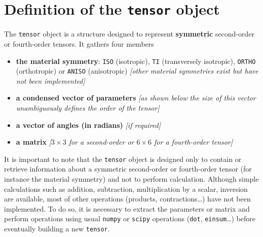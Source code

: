 \documentclass[
  a4paper,
  numbers=noendperiod,
  DIV=12]{scrreprt}
\providecommand{\tightlist}{%
  \setlength{\itemsep}{0pt}\setlength{\parskip}{0pt}}\usepackage{longtable,booktabs,array}
\begin{document}
\section{\texorpdfstring{Definition of the \texttt{tensor}
object}{Definition of the tensor object}}\label{definition-of-the-tensor-object}

The \texttt{tensor} object is a structure designed to represent
\textbf{symmetric} second-order or fourth-order tensors. It gathers four
members

\begin{itemize}
\tightlist
\item
  \textbf{the material symmetry}: \texttt{ISO} (isotropic), \texttt{TI}
  (transversely isotropic), \texttt{ORTHO} (orthotropic) or
  \texttt{ANISO} (anisotropic) \emph{{[}other material symmetries exist
  but have not been implemented{]}}
\item
  \textbf{a condensed vector of parameters} \emph{{[}as shown below the
  size of this vector unambiguously defines the order of the tensor{]}}
\item
  \textbf{a vector of angles (in radians)} \emph{{[}if required{]}}
\item
  \textbf{a matrix} \emph{{[}\(3×3\) for a second-order or \(6×6\) for a
  fourth-order tensor{]}}
\end{itemize}

\begin{tcolorbox}[enhanced jigsaw, title=\textcolor{quarto-callout-warning-color}{\faExclamationTriangle}\hspace{0.5em}{Warning}, left=2mm, titlerule=0mm, colback=white, breakable, colframe=quarto-callout-warning-color-frame, bottomtitle=1mm, toptitle=1mm, rightrule=.15mm, bottomrule=.15mm, coltitle=black, opacitybacktitle=0.6, arc=.35mm, colbacktitle=quarto-callout-warning-color!10!white, leftrule=.75mm, opacityback=0, toprule=.15mm]

It is important to note that the \texttt{tensor} object is designed only
to contain or retrieve information about a symmetric second-order or
fourth-order tensor (for instance the material symmetry) and not to
perform calculation. Although simple calculations such as addition,
subtraction, multiplication by a scalar, inversion are available, most
of other operations (products, contractions\ldots) have not been
implemented. To do so, it is necessary to extract the parameters or
matrix and perform operations using usual \texttt{numpy} or
\texttt{scipy} operations (\texttt{dot}, \texttt{einsum}\ldots) before
eventually building a new \texttt{tensor}.

\end{tcolorbox}
\end{document}
